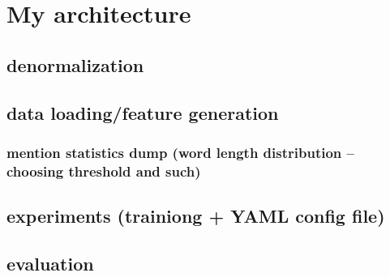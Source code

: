 \chapter{My architecture}

\section{denormalization}

\section{data loading/feature generation}

\subsection{mention statistics dump (word length distribution -- choosing threshold and such)}

\section{experiments (trainiong + YAML config file)}

\section{evaluation}

